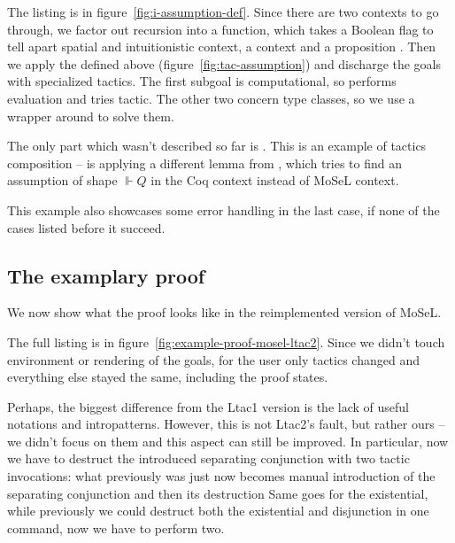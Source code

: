 The listing is in figure~\ref{fig:i-assumption-def}.
Since there are two contexts to go through, we factor out recursion into a  function, which takes a Boolean flag  to tell apart spatial and intuitionistic context, a context  and a proposition .
Then we apply the  defined above (figure~\ref{fig:tac-assumption}) and discharge the goals with specialized tactics.
The first subgoal  is computational, so  performs evaluation and tries  tactic.
The other two concern type classes, so we use a wrapper around  to solve them.

The only part which wasn't described so far is .
This is an example of tactics composition --  is applying a different lemma from , which tries to find an assumption of shape \(\Vdash Q\) in the Coq context instead of MoSeL context.

This example also showcases some error handling in the last case, if none of the cases listed before it succeed.

\subsection{The examplary proof}
\label{sec:examplary-proof-in-ltac2-mosel}

We now show what the proof looks like in the reimplemented version of MoSeL.

The full listing is in figure~\ref{fig:example-proof-mosel-ltac2}.
Since we didn't touch environment or rendering of the goals, for the user only tactics changed and everything else stayed the same, including the proof states.

Perhaps, the biggest difference from the Ltac1 version is the lack of useful notations and intropatterns.
However, this is not Ltac2's fault, but rather ours -- we didn't focus on them and this aspect can still be improved.
In particular, now we have to destruct the introduced separating conjunction with two tactic invocations: what previously was just  now becomes manual introduction of the separating conjunction  and then its destruction 
Same goes for the existential, while previously we could destruct both the existential and disjunction in one command, now we have to perform two.


